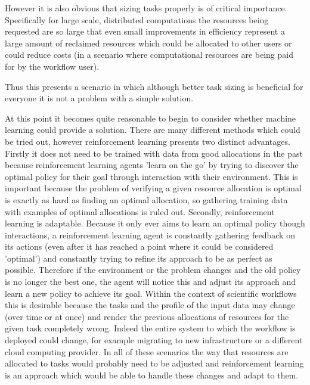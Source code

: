 However it is also obvious that sizing tasks properly is of critical importance. Specifically for large scale, distributed computations the resources being requested are so large that even small improvements in efficiency represent a large amount of reclaimed resources which could be allocated to other users or could reduce costs (in a scenario where computational resources are being paid for by the workflow user). 

Thus this presents a scenario in which although better task sizing is beneficial for everyone it is not a problem with a simple solution.

At this point it becomes quite reasonable to begin to consider whether machine learning could provide a solution. There are many different methods which could be tried out, however reinforcement learning presents two distinct advantages. Firstly it does not need to be trained with data from good allocations in the past because reinforcement learning agents 'learn on the go' by trying to discover the optimal policy for their goal through interaction with their environment. This is important because the problem of verifying a given resource allocation is optimal is exactly as hard as finding an optimal allocation, so gathering training data with examples of optimal allocations is ruled out. Secondly, reinforcement learning is adaptable. Because it only ever aims to learn an optimal policy though interactions, a reinforcement learning agent is constantly gathering feedback on its actions (even after it has reached a point where it could be considered 'optimal') and constantly trying to refine its approach to be as perfect as possible. Therefore if the environment or the problem changes and the old policy is no longer the best one, the agent will notice this and adjust its approach and learn a new policy to achieve its goal. Within the context of scientific workflows this is desirable because the tasks and the profile of the input data may change (over time or at once) and render the previous allocations of resources for the given task completely wrong. Indeed the entire system to which the workflow is deployed could change, for example migrating to new infrastructure or a different cloud computing provider. In all of these scenarios the way that resources are allocated to tasks would probably need to be adjusted and reinforcement learning is an approach which would be able to handle these changes and adapt to them.


